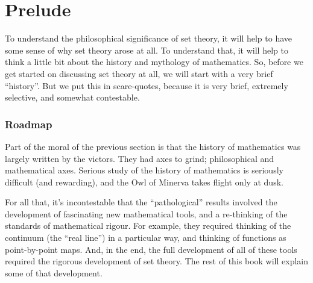 %

\preto{}

\problemsperchapter

\allowdisplaybreaks

\frontmatter

\OLPfrontmatter



\mainmatter

\part{Prelude}


To understand the philosophical significance of set theory, it will
help to have some sense of why set theory arose at all. To understand
that, it will help to think a little bit about the history and
mythology of mathematics. So, before we get started on discussing set
theory at all, we will start with a very brief ``history''. But we put
this in scare-quotes, because it is very brief, extremely selective,
and somewhat contestable.


\section{Roadmap}

Part of the moral of the previous section is that the history of
mathematics was largely written by the victors. They had axes to
grind; philosophical and mathematical axes. Serious study of the
history of mathematics is seriously difficult (and rewarding), and the
Owl of Minerva takes flight only at dusk.

For all that, it's incontestable that the ``pathological'' results
involved the development of fascinating new mathematical tools, and a
re-thinking of the standards of mathematical rigour. For example, they
required thinking of the continuum (the ``real line'') in a particular
way, and thinking of functions as point-by-point maps. And, in the
end, the full development of all of these tools required the rigorous
development of set theory. The rest of this book will explain some of
that development.

